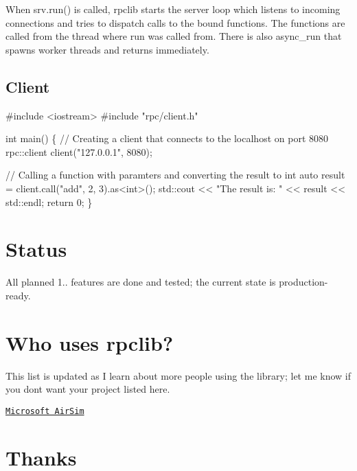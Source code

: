 When {\ttfamily srv.\+run()} is called, {\ttfamily rpclib} starts the server loop which listens to incoming connections and tries to dispatch calls to the bound functions. The functions are called from the thread where {\ttfamily run} was called from. There is also {\ttfamily async\+\_\+run} that spawns worker threads and returns immediately.

\subsection*{Client}


\begin{DoxyCode}
\textcolor{preprocessor}{#include <iostream>}
\textcolor{preprocessor}{#include "rpc/client.h"}

\textcolor{keywordtype}{int} main() \{
    \textcolor{comment}{// Creating a client that connects to the localhost on port 8080}
    rpc::client client(\textcolor{stringliteral}{"127.0.0.1"}, 8080);

    \textcolor{comment}{// Calling a function with paramters and converting the result to int}
    \textcolor{keyword}{auto} result = client.call(\textcolor{stringliteral}{"add"}, 2, 3).as<\textcolor{keywordtype}{int}>();
    std::cout << \textcolor{stringliteral}{"The result is: "} << result << std::endl;
    \textcolor{keywordflow}{return} 0;
\}
\end{DoxyCode}


\section*{Status}

All planned 1.. features are done and tested; the current state is production-\/ready.

\section*{Who uses rpclib?}

This list is updated as I learn about more people using the library; let me know if you don\textquotesingle{}t want your project listed here.


\begin{DoxyItemize}
\item \href{https://github.com/Microsoft/AirSim}{\tt Microsoft Air\+Sim}
\end{DoxyItemize}

\section*{Thanks}

